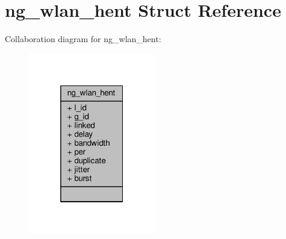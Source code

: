 \hypertarget{structng__wlan__hent}{\section{ng\+\_\+wlan\+\_\+hent Struct Reference}
\label{structng__wlan__hent}
}


Collaboration diagram for ng\+\_\+wlan\+\_\+hent\+:
\nopagebreak
\begin{figure}[H]
\begin{center}
\leavevmode
\includegraphics[width=157pt]{structng__wlan__hent__coll__graph}
\end{center}
\end{figure}
